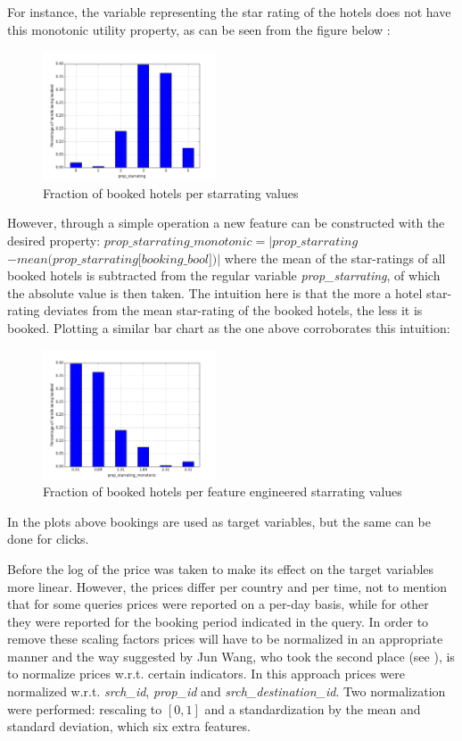 \documentclass{llncs}
\begin{document}
For instance, the variable representing the star rating of the hotels does not have this monotonic utility property, as can be seen from the figure below :
 \begin{figure}[H]
     \centering
     \includegraphics[width=0.60\linewidth, height=145px]{figure_normal_starrate.png}
     \caption{Fraction of booked hotels per starrating values}
     \label{fig:prop_starrating}
 \end{figure}
\noindent However, through a simple operation a new feature can be constructed with the desired property: $\textit{prop\_starrating\_monotonic} = |\textit{prop\_starrating}$ \\ 
$ - \textit{mean(prop\_starrating[booking\_bool])}|$ where the mean of the star-ratings of all booked hotels is subtracted from the regular variable \textit{prop\_starrating}, of which the absolute value is then taken. The intuition here is that the more a hotel star-rating deviates from the mean star-rating of the booked hotels, the less it is booked. Plotting a similar bar chart as the one above corroborates this intuition:
 \begin{figure}[H]
     \centering
     \includegraphics[width=0.60\linewidth, height=145px]{figure_monotonic_starrate.png}
     \caption{Fraction of booked hotels per feature engineered starrating values}
     \label{fig:prop_starrating}
 \end{figure}
\noindent In the plots above bookings are used as target variables, but the same can be done for clicks.

Before the log of the price was taken to make its effect on the target variables more linear. However, the prices differ per country and per time, not to mention that for some queries prices were reported on a per-day basis, while for other they were reported for the booking period indicated in the query. In order to remove these scaling factors prices will have to be normalized in an appropriate manner and the way suggested by Jun Wang, who took the second place (see \cite{Wang2013}), is to normalize prices w.r.t. certain indicators.  In this approach prices were normalized w.r.t. \textit{srch\_id}, \textit{prop\_id} and \textit{srch\_destination\_id}. Two normalization were performed: rescaling to $[0,1]$ and a standardization by the mean and standard deviation, which six extra features.
\end{document}
